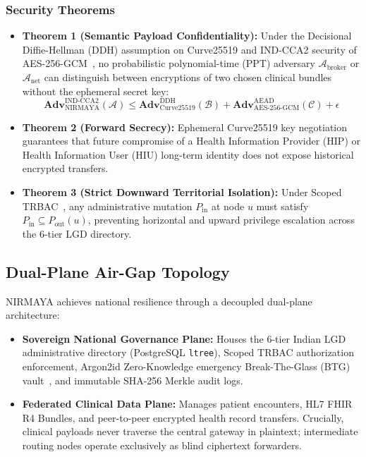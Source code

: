 \documentclass[journal,twocolumn]{IEEEtran}
\begin{document}
\subsubsection{Security Theorems}
\begin{itemize}
    \item \textbf{Theorem 1 (Semantic Payload Confidentiality):} Under the Decisional Diffie-Hellman (DDH) assumption on Curve25519 and IND-CCA2 security of AES-256-GCM~\cite{goldreich_crypto}, no probabilistic polynomial-time (PPT) adversary $\mathcal{A}_{\text{broker}}$ or $\mathcal{A}_{\text{net}}$ can distinguish between encryptions of two chosen clinical bundles without the ephemeral secret key:
    \begin{equation}
        \mathbf{Adv}_{\text{NIRMAYA}}^{\text{IND-CCA2}}(\mathcal{A}) \le \mathbf{Adv}_{\text{Curve25519}}^{\text{DDH}}(\mathcal{B}) + \mathbf{Adv}_{\text{AES-256-GCM}}^{\text{AEAD}}(\mathcal{C}) + \epsilon
    \end{equation}
    \item \textbf{Theorem 2 (Forward Secrecy):} Ephemeral Curve25519 key negotiation guarantees that future compromise of a Health Information Provider (HIP) or Health Information User (HIU) long-term identity does not expose historical encrypted transfers.
    \item \textbf{Theorem 3 (Strict Downward Territorial Isolation):} Under Scoped TRBAC~\cite{sandhu_rbac}, any administrative mutation $P_{\text{in}}$ at node $u$ must satisfy $P_{\text{in}} \subseteq P_{\text{out}}(u)$, preventing horizontal and upward privilege escalation across the 6-tier LGD directory.
\end{itemize}

\subsection{Dual-Plane Air-Gap Topology}
NIRMAYA achieves national resilience through a decoupled dual-plane architecture:
\begin{itemize}
    \item \textbf{Sovereign National Governance Plane:} Houses the 6-tier Indian LGD administrative directory (PostgreSQL \texttt{ltree}), Scoped TRBAC authorization enforcement, Argon2id Zero-Knowledge emergency Break-The-Glass (BTG) vault~\cite{biryukov_argon2}, and immutable SHA-256 Merkle audit logs.
    \item \textbf{Federated Clinical Data Plane:} Manages patient encounters, HL7 FHIR R4 Bundles, and peer-to-peer encrypted health record transfers. Crucially, clinical payloads never traverse the central gateway in plaintext; intermediate routing nodes operate exclusively as blind ciphertext forwarders.
\end{itemize}
\end{document}

